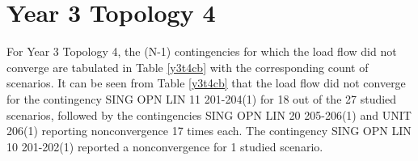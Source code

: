 \documentclass[10pt]{report}
\begin{document}
\begin{table}[H]
\caption{Count of scenarios for which (N-1) contingencies failed to converge - Year 3, Topology 3}
\label{y3t3cb}
\centering
{}
\end{table}


\section{Year 3 Topology 4}

For Year 3 Topology 4, the (N-1) contingencies for which the load flow did not converge are tabulated in Table \ref{y3t4cb} with the corresponding count of scenarios. It can be seen from Table \ref{y3t4cb} that the load flow did not converge for the contingency SING OPN LIN   11 201-204(1) for 18 out of the 27 studied scenarios, followed by the contingencies SING OPN LIN   20 205-206(1) and UNIT 206(1) reporting nonconvergence 17 times each. The contingency SING OPN LIN   10 201-202(1) reported a nonconvergence for 1 studied scenario.  

\begin{table}[H]
\caption{Count of scenarios for which (N-1) contingencies failed to converge - Year 3, Topology 4}
\label{y3t4cb}
\centering
{}
\end{table}
\end{document}
